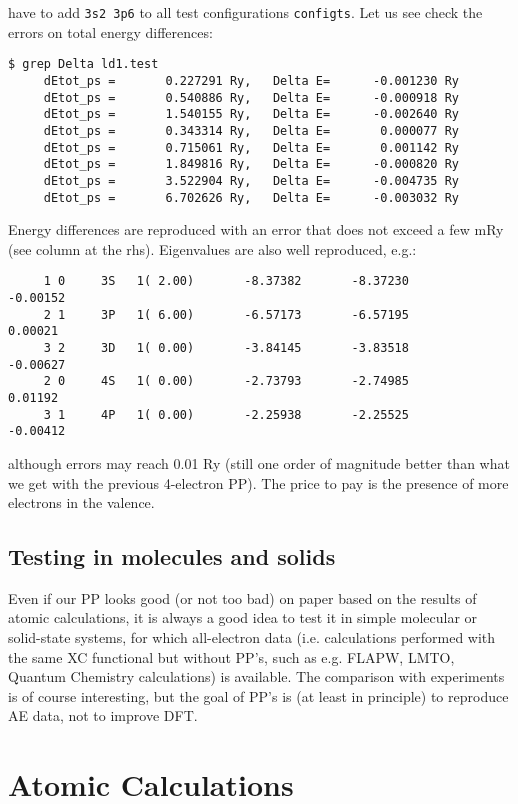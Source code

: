 \documentclass[12pt,a4paper]{article}
\begin{document}
have to add \texttt{3s2 3p6} to all test configurations
\texttt{configts}. Let us see check the errors on total energy 
differences:
\begin{verbatim}
$ grep Delta ld1.test
     dEtot_ps =       0.227291 Ry,   Delta E=      -0.001230 Ry
     dEtot_ps =       0.540886 Ry,   Delta E=      -0.000918 Ry
     dEtot_ps =       1.540155 Ry,   Delta E=      -0.002640 Ry
     dEtot_ps =       0.343314 Ry,   Delta E=       0.000077 Ry
     dEtot_ps =       0.715061 Ry,   Delta E=       0.001142 Ry
     dEtot_ps =       1.849816 Ry,   Delta E=      -0.000820 Ry
     dEtot_ps =       3.522904 Ry,   Delta E=      -0.004735 Ry
     dEtot_ps =       6.702626 Ry,   Delta E=      -0.003032 Ry
\end{verbatim}
Energy differences are reproduced with an
error that does not exceed a few mRy (see column at the rhs). 
Eigenvalues are also well reproduced, e.g.:
\begin{verbatim}
     1 0     3S   1( 2.00)       -8.37382       -8.37230       -0.00152
     2 1     3P   1( 6.00)       -6.57173       -6.57195        0.00021
     3 2     3D   1( 0.00)       -3.84145       -3.83518       -0.00627
     2 0     4S   1( 0.00)       -2.73793       -2.74985        0.01192
     3 1     4P   1( 0.00)       -2.25938       -2.25525       -0.00412
\end{verbatim}
although errors may reach 0.01 Ry (still one order of magnitude 
better than what we get with the previous 4-electron PP). The price 
to pay is the presence of more electrons in the valence.
\newpage
\subsection{Testing in molecules and solids}

Even if our PP looks good
(or not too bad) on paper based on the results of atomic calculations,
it is always a good idea to test it in simple molecular or solid-state
systems, for which all-electron data (i.e. calculations performed with
the same XC functional but without PP's, such as e.g. FLAPW, LMTO,
Quantum Chemistry calculations) is available. The comparison with
experiments is of course interesting, but the goal of PP's is (at least in principle) to 
reproduce AE data, not to improve DFT.


\appendix

\section{Atomic Calculations}
\end{document}
